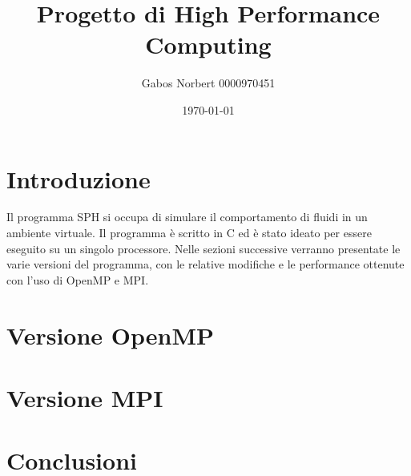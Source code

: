 \documentclass[a4paper,12pt, oneside]{article}
\title{Progetto di High Performance Computing}
\author{Gabos Norbert 0000970451}
\date{\today}
\begin{document}
\maketitle

\section{Introduzione}

Il programma SPH si occupa di simulare il comportamento di fluidi in un ambiente virtuale.
Il programma è scritto in C ed è stato ideato per essere eseguito su un singolo processore.
Nelle sezioni successive verranno presentate le varie versioni del programma, con le relative
modifiche e le performance ottenute con l'uso di OpenMP e MPI.

\section{Versione OpenMP}



\section{Versione MPI}
\section{Conclusioni}
\end{document}
